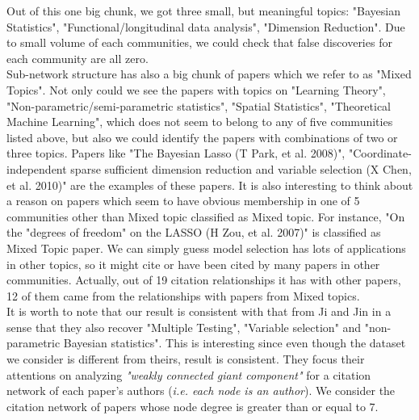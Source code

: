 \documentclass{article}
\begin{document}
\noindent Out of this one big chunk, we got three small, but meaningful topics: "Bayesian Statistics", "Functional/longitudinal data analysis", "Dimension Reduction". Due to small volume of each communities, we could check that false discoveries for each community are all zero. \\

\noindent Sub-network structure has also a big chunk of papers which we refer to as "Mixed Topics". Not only could we see the papers with topics on "Learning Theory", "Non-parametric/semi-parametric statistics", "Spatial Statistics", "Theoretical Machine Learning", which does not seem to belong to any of five communities listed above, but also we could identify the papers with combinations of two or three topics. Papers like "The Bayesian Lasso (T Park, et al. 2008)", "Coordinate-independent sparse sufficient dimension reduction and variable selection (X Chen, et al. 2010)" are the examples of these papers. It is also interesting to think about a reason on papers which seem to have obvious membership in one of 5 communities other than Mixed topic classified as Mixed topic. For instance, "On the "degrees of freedom" on the LASSO (H Zou, et al. 2007)" is classified as Mixed Topic paper. We can simply guess model selection has lots of applications in other topics, so it might cite or have been cited by many papers in other communities. Actually, out of 19 citation relationships it has with other papers, 12 of them came from the relationships with papers from Mixed topics. \\

\noindent It is worth to note that our result is consistent with that from Ji and Jin in a sense that they also recover "Multiple Testing", "Variable selection" and "non-parametric Bayesian statistics". This is interesting since even though the dataset we consider is different from theirs, result is consistent. They focus their attentions on analyzing {\it "weakly connected giant component"} for a citation network of each paper's authors ({\it i.e. each node is an author}). We consider the citation network of papers whose node degree is greater than or equal to 7.\\
\end{document}
